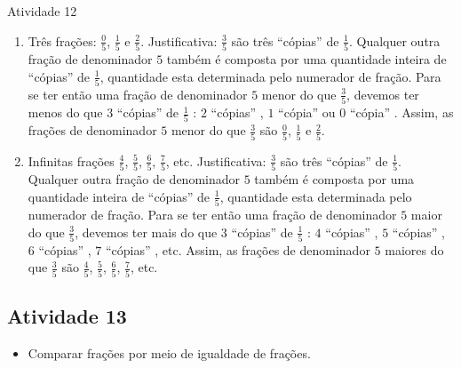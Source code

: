 \begin{multicols}{2}
\begin{resposta*}{Atividade 12}  
\begin{enumerate} [\quad a)] %
    \item       Três frações:       $\frac{0}{5}$,       $\frac{1}{5}$       e   
    $\frac{2}{5}$. Justificativa:       $\frac{3}{5}$       são três       
``cópias''       de       $\frac{1}{5}$. Qualquer outra fração de denominador    
   $5$       também é composta por uma quantidade inteira de       ``cópias''    
   de       $\frac{1}{5}$, quantidade esta determinada pelo numerador de fração. 
Para se ter então uma fração de denominador       $5$       menor do que       
$\frac{3}{5}$, devemos ter menos do que       $3$             ``cópias''       
de       $\frac{1}{5}$      :       $2$             ``cópias''      ,       $1$  
           ``cópia''       ou       $0$             ``cópia''      . Assim, as 
frações de denominador       $5$       menor do que       $\frac{3}{5}$       
são       $\frac{0}{5}$,       $\frac{1}{5}$       e       $\frac{2}{5}$. 
    \item       Infinitas frações       $\frac{4}{5}$,       $\frac{5}{5}$,      
 $\frac{6}{5}$,       $\frac{7}{5}$, etc. Justificativa:       $\frac{3}{5}$     
  são três       ``cópias''       de       $\frac{1}{5}$. Qualquer outra fração 
de denominador       $5$       também é composta por uma quantidade inteira de   
    ``cópias''       de       $\frac{1}{5}$, quantidade esta determinada pelo 
numerador de fração. Para se ter então uma fração de denominador       $5$       
maior do que       $\frac{3}{5}$, devemos ter mais do que       $3$             
``cópias''       de       $\frac{1}{5}$      :       $4$             ``cópias''  
    ,       $5$             ``cópias''      ,       $6$             ``cópias''   
   ,       $7$             ``cópias''      , etc. Assim, as frações de 
denominador       $5$       maiores do que       $\frac{3}{5}$       são       
$\frac{4}{5}$,       $\frac{5}{5}$,       $\frac{6}{5}$,       $\frac{7}{5}$, 
etc.
\end{enumerate} %
  
\end{resposta*}



\subsection{Atividade 13}

\begin{itemize} %
    \item       Comparar frações por meio de igualdade de frações.
\end{itemize} %
  

\end{multicols}
